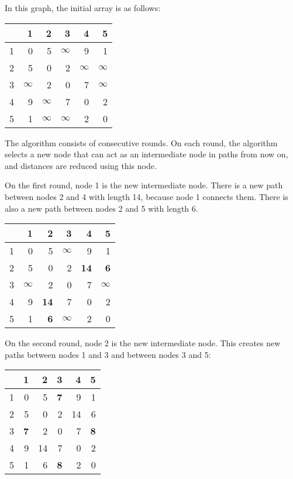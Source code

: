 In this graph, the initial array is as follows:
\begin{center}
\begin{tabular}{r|rrrrr}
 & 1 & 2 & 3 & 4 & 5 \\
\hline
1 & 0 & 5 & $\infty$ & 9 & 1 \\
2 & 5 & 0 & 2 & $\infty$ & $\infty$ \\
3 & $\infty$ & 2 & 0 & 7 & $\infty$ \\
4 & 9 & $\infty$ & 7 & 0 & 2 \\
5 & 1 & $\infty$ & $\infty$ & 2 & 0 \\
\end{tabular}
\end{center}
\vspace{10pt}
The algorithm consists of consecutive rounds.
On each round, the algorithm selects a new node
that can act as an intermediate node in paths from now on,
and distances are reduced using this node.

On the first round, node 1 is the new intermediate node.
There is a new path between nodes 2 and 4
with length 14, because node 1 connects them.
There is also a new path 
between nodes 2 and 5 with length 6.

\begin{center}
\begin{tabular}{r|rrrrr}
 & 1 & 2 & 3 & 4 & 5 \\
\hline
1 & 0 & 5 & $\infty$ & 9 & 1 \\
2 & 5 & 0 & 2 & \textbf{14} & \textbf{6} \\
3 & $\infty$ & 2 & 0 & 7 & $\infty$ \\
4 & 9 & \textbf{14} & 7 & 0 & 2 \\
5 & 1 & \textbf{6} & $\infty$ & 2 & 0 \\
\end{tabular}
\end{center}
\vspace{10pt}

On the second round, node 2 is the new intermediate node.
This creates new paths between nodes 1 and 3
and between nodes 3 and 5:

\begin{center}
\begin{tabular}{r|rrrrr}
 & 1 & 2 & 3 & 4 & 5 \\
\hline
1 & 0 & 5 & \textbf{7} & 9 & 1 \\
2 & 5 & 0 & 2 & 14 & 6 \\
3 & \textbf{7} & 2 & 0 & 7 & \textbf{8} \\
4 & 9 & 14 & 7 & 0 & 2 \\
5 & 1 & 6 & \textbf{8} & 2 & 0 \\
\end{tabular}
\end{center}
\vspace{10pt}

